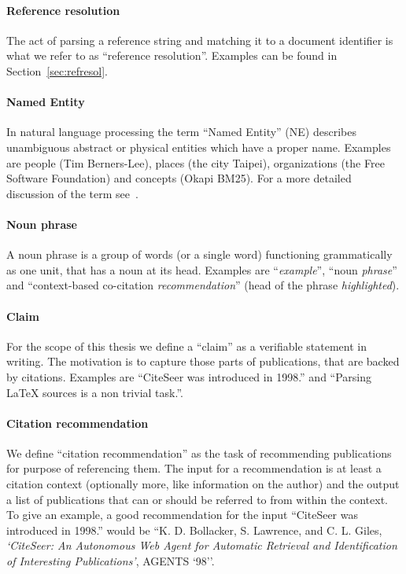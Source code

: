\paragraph{Reference resolution} The act of parsing a reference string and matching it to a document identifier is what we refer to as ``reference resolution''. Examples can be found in Section~\ref{sec:refresol}.
\paragraph{Named Entity} In natural language processing the term ``Named Entity'' (NE) describes unambiguous abstract or physical entities which have a proper name. Examples are people (Tim Berners-Lee), places (the city Taipei), organizations (the Free Software Foundation) and concepts (Okapi BM25). For a more detailed discussion of the term see~\cite{Nadeau2007}.
\paragraph{Noun phrase} A noun phrase is a group of words (or a single word) functioning grammatically as one unit, that has a noun at its head. Examples are ``\emph{example}'', ``noun \emph{phrase}'' and ``context-based co-citation \emph{recommendation}'' (head of the phrase \emph{highlighted}).
\paragraph{Claim} For the scope of this thesis we define a ``claim'' as a verifiable statement in writing. The motivation is to capture those parts of publications, that are backed by citations. Examples are ``CiteSeer was introduced in 1998.'' and ``Parsing \LaTeX{} sources is a non trivial task.''.
\paragraph{Citation recommendation} We define ``citation recommendation'' as the task of recommending publications for purpose of referencing them. The input for a recommendation is at least a citation context (optionally more, like information on the author) and the output a list of publications that can or should be referred to from within the context. To give an example, a good recommendation for the input ``CiteSeer was introduced in 1998.'' would be ``K. D. Bollacker, S. Lawrence, and C. L. Giles, \emph{`CiteSeer: An Autonomous Web Agent for Automatic Retrieval and Identification of Interesting Publications'}, AGENTS `98''.

